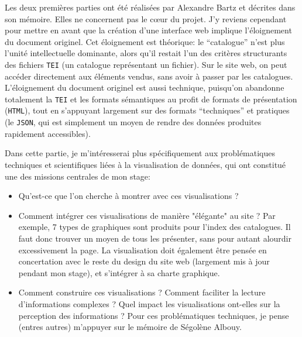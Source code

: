 \documentclass[a4paper, 12pt, twoside]{book}
\newcommand{\html}{\texttt{HTML}}
\newcommand{\json}{\texttt{JSON}}
\newcommand{\tei}{\texttt{TEI}}
\begin{document}
Les deux premières parties ont été réalisées par Alexandre Bartz et décrites dans son mémoire. Elles ne concernent pas le cœur du projet. J'y reviens cependant pour mettre en avant que la création d'une interface web implique l'éloignement du document originel. Cet éloignement est théorique: le \enquote{catalogue} n'est plus l'unité intellectuelle dominante, alors qu'il restait l'un des critères structurants des fichiers \tei{} (un catalogue représentant un fichier). Sur le site web, on peut accéder directement aux éléments vendus, sans avoir à passer par les catalogues. L'éloignement du document originel est aussi technique, puisqu'on abandonne totalement la \tei{} et les formats sémantiques au profit de formats de présentation (\html{}), tout en s'appuyant largement sur des formats \enquote{techniques} et pratiques (le \json, qui est simplement un moyen de rendre des données produites rapidement accessibles).

Dans cette partie, je m'intéresserai plus spécifiquement aux problématiques techniques et scientifiques liées à la visualisation de données, qui ont constitué une des missions centrales de mon stage:
\begin{itemize}
	\item Qu'est-ce que l'on cherche à montrer avec ces visualisations ?
 	\item Comment intégrer ces visualisations de manière "élégante" au site ? Par exemple, 7 types de graphiques sont produits pour l'index des catalogues. Il faut donc trouver un moyen de tous les présenter, sans pour autant alourdir excessivement la page. La visualisation doit également être pensée en concertation avec le reste du design du site web (largement mis à jour pendant mon stage), et s'intégrer à sa charte graphique.
	\item Comment construire ces visualisations ? Comment faciliter la lecture d'informations complexes ? Quel impact les visualisations ont-elles sur la perception des informations ? Pour ces problématiques techniques, je pense (entres autres) m'appuyer sur le mémoire de Ségolène Albouy.
\end{itemize}
\end{document}
